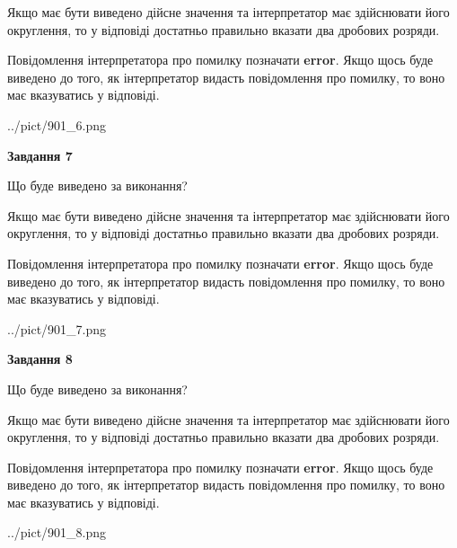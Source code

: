 \documentclass[12pt, ukrainian]{article}
\begin{document}
{\begin {Large}
Якщо має бути виведено дійсне значення та інтерпретатор має здійснювати його округлення, 
то у відповіді достатньо правильно вказати два дробових розряди.

Повідомлення інтерпретатора про помилку позначати \textbf{error}.
Якщо щось буде виведено до того, як інтерпретатор видасть повідомлення про помилку, 
то воно має вказуватись у відповіді. \par

\begin{center}
	{../pict/901_6.png}
\end{center}
\newpage

{\begin {center}\textbf{Завдання 7}\end {center}}\par
Що буде виведено за виконання? \par

Якщо має бути виведено дійсне значення та інтерпретатор має здійснювати його округлення, 
то у відповіді достатньо правильно вказати два дробових розряди.

Повідомлення інтерпретатора про помилку позначати \textbf{error}.
Якщо щось буде виведено до того, як інтерпретатор видасть повідомлення про помилку, 
то воно має вказуватись у відповіді. \par

\begin{center}
	{../pict/901_7.png}
\end{center}
\newpage

{\begin {center}\textbf{Завдання 8}\end {center}}\par
Що буде виведено за виконання? \par

Якщо має бути виведено дійсне значення та інтерпретатор має здійснювати його округлення, 
то у відповіді достатньо правильно вказати два дробових розряди.

Повідомлення інтерпретатора про помилку позначати \textbf{error}.
Якщо щось буде виведено до того, як інтерпретатор видасть повідомлення про помилку, 
то воно має вказуватись у відповіді. \par

\begin{center}
	{../pict/901_8.png}
\end{center}
\newpage


\end{Large}}
\end{document}
